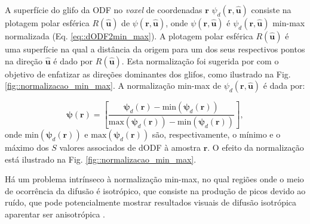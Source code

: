 \documentclass[
    12pt,                %
    oneside,            %
    a4paper,            %
    english,            %
    french,                %
    spanish,            %
    brazil                %
    ]{abntex2}
\begin{document}
A superfície do glifo da ODF no \textit{voxel} de coordenadas $\mathbf{r}$ $\psi_d(\mathbf{r}, \mathbf{\hat{u}})$ consiste na plotagem polar esférica $R(\mathbf{\hat{u}})$ de $\psi(\mathbf{r}, \mathbf{\hat{u}})$, onde $\psi(\mathbf{r}, \mathbf{\hat{u}})$ é $\psi_d(\mathbf{r}, \mathbf{\hat{u}})$ min-max normalizada  (Eq. \ref{eq::dODF2min_max}). A plotagem polar esférica $R(\mathbf{\hat{u}})$ é uma superfície na qual a distância da origem para um dos seus respectivos pontos na direção $\mathbf{\hat{u}}$ é dado por $R(\mathbf{\hat{u}})$. Esta normalização foi sugerida por  com o objetivo de enfatizar as direções dominantes dos glifos, como ilustrado na Fig. \ref{fig::normalizacao_min_max}. A normalização min-max de $\psi_d(\mathbf{r}, \mathbf{\hat{u}})$ é dada por:





\begin{equation}
\label{eq::dODF2min_max}
    \boldsymbol{\psi}(\mathbf{r}) = [ \frac{\boldsymbol{\psi}_d(\mathbf{r}) - \text{min}(\boldsymbol{\psi}_d(\mathbf{r}))}{\text{max}(\boldsymbol{\psi}_d(\mathbf{r})) - \text{min}(\boldsymbol{\psi}_d(\mathbf{r}))}],
\end{equation}
onde $\text{min}(\boldsymbol{\psi}_d(\mathbf{r}))$ e $\text{max}(\boldsymbol{\psi}_d(\mathbf{r}))$ são, respectivamente, o mínimo e o máximo dos $S$ valores associados de dODF à amostra $\mathbf{r}$. O efeito da normalização está ilustrado na Fig. \ref{fig::normalizacao_min_max}. 

Há um problema intrínseco à normalização min-max, no qual regiões onde o meio de ocorrência da difusão é isotrópico, que consiste na produção de picos devido ao ruído, que pode potencialmente mostrar resultados visuais de difusão isotrópica aparentar ser anisotrópica \cite{TuchQBall2004}.


\end{document}
